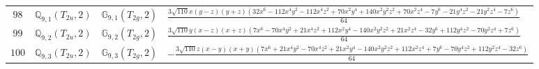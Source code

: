 \documentclass[fleqn,8pt,landscape]{jsarticle}
\begin{document}
\begin{table}[ht!]
\begin{center}
\begin{tabular}{cccl}
$ 98 $ & $ \mathbb{Q}_{9,1}(T_{2u},2) $ & $ \mathbb{G}_{9,1}(T_{2g},2) $ & $ \frac{3 \sqrt{110} x \left(y - z\right) \left(y + z\right) \left(32 x^{6} - 112 x^{4} y^{2} - 112 x^{4} z^{2} + 70 x^{2} y^{4} + 140 x^{2} y^{2} z^{2} + 70 x^{2} z^{4} - 7 y^{6} - 21 y^{4} z^{2} - 21 y^{2} z^{4} - 7 z^{6}\right)}{64} $ \\
$ 99 $ & $ \mathbb{Q}_{9,2}(T_{2u},2) $ & $ \mathbb{G}_{9,2}(T_{2g},2) $ & $ \frac{3 \sqrt{110} y \left(x - z\right) \left(x + z\right) \left(7 x^{6} - 70 x^{4} y^{2} + 21 x^{4} z^{2} + 112 x^{2} y^{4} - 140 x^{2} y^{2} z^{2} + 21 x^{2} z^{4} - 32 y^{6} + 112 y^{4} z^{2} - 70 y^{2} z^{4} + 7 z^{6}\right)}{64} $ \\
$ 100 $ & $ \mathbb{Q}_{9,3}(T_{2u},2) $ & $ \mathbb{G}_{9,3}(T_{2g},2) $ & $ - \frac{3 \sqrt{110} z \left(x - y\right) \left(x + y\right) \left(7 x^{6} + 21 x^{4} y^{2} - 70 x^{4} z^{2} + 21 x^{2} y^{4} - 140 x^{2} y^{2} z^{2} + 112 x^{2} z^{4} + 7 y^{6} - 70 y^{4} z^{2} + 112 y^{2} z^{4} - 32 z^{6}\right)}{64} $ \\
 \hline \hline
\end{tabular}
\end{center}
\end{table}
\end{document}
